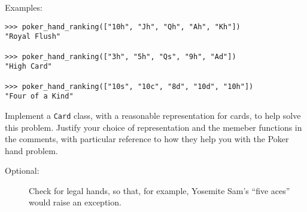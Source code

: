 \documentclass{article}
\begin{document}
\begin{enumerate}
Examples:
\begin{lstlisting}
>>> poker_hand_ranking(["10h", "Jh", "Qh", "Ah", "Kh"]) 
"Royal Flush"

>>> poker_hand_ranking(["3h", "5h", "Qs", "9h", "Ad"]) 
"High Card"

>>> poker_hand_ranking(["10s", "10c", "8d", "10d", "10h"]) 
"Four of a Kind"
\end{lstlisting}

Implement a {\tt Card} class, with a reasonable representation for
cards, to help solve this problem.  Justify your choice of representation
and the memeber functions
in the comments, with particular reference to how they help you with
the Poker hand problem.

\begin{description}
\item[Optional:] Check for legal hands, so that, for example,
Yosemite Sam's ``five aces'' would raise an exception.
\end{description}
\end{enumerate}
\end{document}
